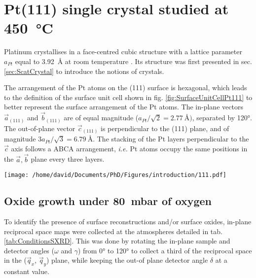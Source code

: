 \section{Pt(111) single crystal studied at \qty{450}{\degreeCelsius}} \label{sec:SXRD111}

Platinum crystallises in a face-centred cubic structure with a lattice parameter $a_{Pt}$ equal to \qty{3.92}{\angstrom} at room temperature \parencite{Waseda1975}.
Its structure was first presented in sec. \ref{sec:ScatCrystal} to introduce the notions of crystals.

The arrangement of the Pt atoms on the (111) surface is hexagonal, which leads to the definition of the surface unit cell shown in fig. \ref{fig:SurfaceUnitCellPt111} to better represent the surface arrangement of the Pt atoms.
The in-plane vectors $\vec{a}_{(111)}$ and $\vec{b}_{(111)}$ are of equal magnitude ($a_{Pt} / \sqrt{2} = \qty{2.77}{\angstrom})$, separated by \ang{120}.
The out-of-plane vector $\vec{c}_{(111)}$ is perpendicular to the (111) plane, and of magnitude $3 a_{Pt} / \sqrt{3} = \qty{6.79}{\angstrom}$.
The stacking of the Pt layers perpendicular to the $\vec{c}$ axis follows a ABCA arrangement, \textit{i.e.} Pt atoms occupy the same positions in the $\vec{a}, \vec{b}$ plane every three layers.

\begin{SCfigure}
    \centering
    \texttt{[image: /home/david/Documents/PhD/Figures/introduction/111.pdf]}
    \caption{
        Face-centred cubic unit cell of Pt with (111) crystallographic plane drawn in green.
        $\vec{a}_{(111)}$, $\vec{b}_{(111)}$ and $\vec{c}_{(111)}$ are the $(111)$ surface unit cell vectors.
        There are three \{111\} planes spanned by the magnitude of $\vec{c}_{(111)}$ (blue, red and green on the figure).
    }
    \label{fig:SurfaceUnitCellPt111}
\end{SCfigure}

\subsection{Oxide growth under \qty{80}{\milli\bar} of oxygen}

To identify the presence of surface reconstructions and/or surface oxides, in-plane reciprocal space maps were collected at the atmospheres detailed in tab. \ref{tab:ConditionsSXRD}.
This was done by rotating the in-plane sample and detector angles ($\omega$ and $\gamma$) from \ang{0} to \ang{120} to collect a third of the reciprocal space in the ($\vec{q}_x$, $\vec{q}_y$) plane, while keeping the out-of plane detector angle $\delta$ at a constant value.

